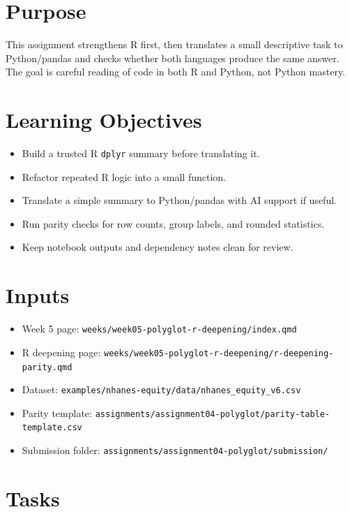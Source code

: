 \documentclass[
  letterpaper,
  DIV=11,
  numbers=noendperiod,
  oneside]{scrreprt}
\providecommand{\tightlist}{%
  \setlength{\itemsep}{0pt}\setlength{\parskip}{0pt}}
\begin{document}
\section{Purpose}\label{purpose-6}

This assignment strengthens R first, then translates a small descriptive
task to Python/pandas and checks whether both languages produce the same
answer. The goal is careful reading of code in both R and Python, not
Python mastery.

\section{Learning Objectives}\label{learning-objectives-5}

\begin{itemize}
\tightlist
\item
  Build a trusted R \texttt{dplyr} summary before translating it.
\item
  Refactor repeated R logic into a small function.
\item
  Translate a simple summary to Python/pandas with AI support if useful.
\item
  Run parity checks for row counts, group labels, and rounded
  statistics.
\item
  Keep notebook outputs and dependency notes clean for review.
\end{itemize}

\section{Inputs}\label{inputs-5}

\begin{itemize}
\tightlist
\item
  Week 5 page: \texttt{weeks/week05-polyglot-r-deepening/index.qmd}
\item
  R deepening page:
  \texttt{weeks/week05-polyglot-r-deepening/r-deepening-parity.qmd}
\item
  Dataset: \texttt{examples/nhanes-equity/data/nhanes\_equity\_v6.csv}
\item
  Parity template:
  \texttt{assignments/assignment04-polyglot/parity-table-template.csv}
\item
  Submission folder:
  \texttt{assignments/assignment04-polyglot/submission/}
\end{itemize}

\section{Tasks}\label{tasks-3}
\end{document}
